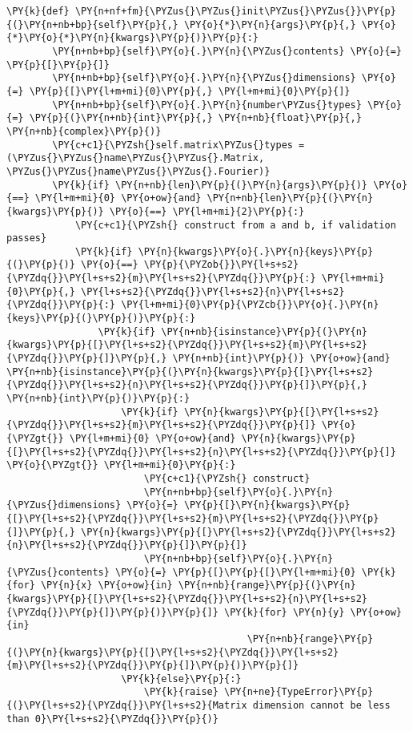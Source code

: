 \begin{Verbatim}[commandchars=\\\{\}]
    \PY{k}{def} \PY{n+nf+fm}{\PYZus{}\PYZus{}init\PYZus{}\PYZus{}}\PY{p}{(}\PY{n+nb+bp}{self}\PY{p}{,} \PY{o}{*}\PY{n}{args}\PY{p}{,} \PY{o}{*}\PY{o}{*}\PY{n}{kwargs}\PY{p}{)}\PY{p}{:}
        \PY{n+nb+bp}{self}\PY{o}{.}\PY{n}{\PYZus{}contents} \PY{o}{=} \PY{p}{[}\PY{p}{]}
        \PY{n+nb+bp}{self}\PY{o}{.}\PY{n}{\PYZus{}dimensions} \PY{o}{=} \PY{p}{[}\PY{l+m+mi}{0}\PY{p}{,} \PY{l+m+mi}{0}\PY{p}{]}
        \PY{n+nb+bp}{self}\PY{o}{.}\PY{n}{number\PYZus{}types} \PY{o}{=} \PY{p}{(}\PY{n+nb}{int}\PY{p}{,} \PY{n+nb}{float}\PY{p}{,} \PY{n+nb}{complex}\PY{p}{)}
        \PY{c+c1}{\PYZsh{}self.matrix\PYZus{}types = (\PYZus{}\PYZus{}name\PYZus{}\PYZus{}.Matrix, \PYZus{}\PYZus{}name\PYZus{}\PYZus{}.Fourier)}
        \PY{k}{if} \PY{n+nb}{len}\PY{p}{(}\PY{n}{args}\PY{p}{)} \PY{o}{==} \PY{l+m+mi}{0} \PY{o+ow}{and} \PY{n+nb}{len}\PY{p}{(}\PY{n}{kwargs}\PY{p}{)} \PY{o}{==} \PY{l+m+mi}{2}\PY{p}{:}
            \PY{c+c1}{\PYZsh{} construct from a and b, if validation passes}
            \PY{k}{if} \PY{n}{kwargs}\PY{o}{.}\PY{n}{keys}\PY{p}{(}\PY{p}{)} \PY{o}{==} \PY{p}{\PYZob{}}\PY{l+s+s2}{\PYZdq{}}\PY{l+s+s2}{m}\PY{l+s+s2}{\PYZdq{}}\PY{p}{:} \PY{l+m+mi}{0}\PY{p}{,} \PY{l+s+s2}{\PYZdq{}}\PY{l+s+s2}{n}\PY{l+s+s2}{\PYZdq{}}\PY{p}{:} \PY{l+m+mi}{0}\PY{p}{\PYZcb{}}\PY{o}{.}\PY{n}{keys}\PY{p}{(}\PY{p}{)}\PY{p}{:}
                \PY{k}{if} \PY{n+nb}{isinstance}\PY{p}{(}\PY{n}{kwargs}\PY{p}{[}\PY{l+s+s2}{\PYZdq{}}\PY{l+s+s2}{m}\PY{l+s+s2}{\PYZdq{}}\PY{p}{]}\PY{p}{,} \PY{n+nb}{int}\PY{p}{)} \PY{o+ow}{and} \PY{n+nb}{isinstance}\PY{p}{(}\PY{n}{kwargs}\PY{p}{[}\PY{l+s+s2}{\PYZdq{}}\PY{l+s+s2}{n}\PY{l+s+s2}{\PYZdq{}}\PY{p}{]}\PY{p}{,} \PY{n+nb}{int}\PY{p}{)}\PY{p}{:}
                    \PY{k}{if} \PY{n}{kwargs}\PY{p}{[}\PY{l+s+s2}{\PYZdq{}}\PY{l+s+s2}{m}\PY{l+s+s2}{\PYZdq{}}\PY{p}{]} \PY{o}{\PYZgt{}} \PY{l+m+mi}{0} \PY{o+ow}{and} \PY{n}{kwargs}\PY{p}{[}\PY{l+s+s2}{\PYZdq{}}\PY{l+s+s2}{n}\PY{l+s+s2}{\PYZdq{}}\PY{p}{]} \PY{o}{\PYZgt{}} \PY{l+m+mi}{0}\PY{p}{:}
                        \PY{c+c1}{\PYZsh{} construct}
                        \PY{n+nb+bp}{self}\PY{o}{.}\PY{n}{\PYZus{}dimensions} \PY{o}{=} \PY{p}{[}\PY{n}{kwargs}\PY{p}{[}\PY{l+s+s2}{\PYZdq{}}\PY{l+s+s2}{m}\PY{l+s+s2}{\PYZdq{}}\PY{p}{]}\PY{p}{,} \PY{n}{kwargs}\PY{p}{[}\PY{l+s+s2}{\PYZdq{}}\PY{l+s+s2}{n}\PY{l+s+s2}{\PYZdq{}}\PY{p}{]}\PY{p}{]}
                        \PY{n+nb+bp}{self}\PY{o}{.}\PY{n}{\PYZus{}contents} \PY{o}{=} \PY{p}{[}\PY{p}{[}\PY{l+m+mi}{0} \PY{k}{for} \PY{n}{x} \PY{o+ow}{in} \PY{n+nb}{range}\PY{p}{(}\PY{n}{kwargs}\PY{p}{[}\PY{l+s+s2}{\PYZdq{}}\PY{l+s+s2}{n}\PY{l+s+s2}{\PYZdq{}}\PY{p}{]}\PY{p}{)}\PY{p}{]} \PY{k}{for} \PY{n}{y} \PY{o+ow}{in}
                                          \PY{n+nb}{range}\PY{p}{(}\PY{n}{kwargs}\PY{p}{[}\PY{l+s+s2}{\PYZdq{}}\PY{l+s+s2}{m}\PY{l+s+s2}{\PYZdq{}}\PY{p}{]}\PY{p}{)}\PY{p}{]}
                    \PY{k}{else}\PY{p}{:}
                        \PY{k}{raise} \PY{n+ne}{TypeError}\PY{p}{(}\PY{l+s+s2}{\PYZdq{}}\PY{l+s+s2}{Matrix dimension cannot be less than 0}\PY{l+s+s2}{\PYZdq{}}\PY{p}{)}


\end{Verbatim}
